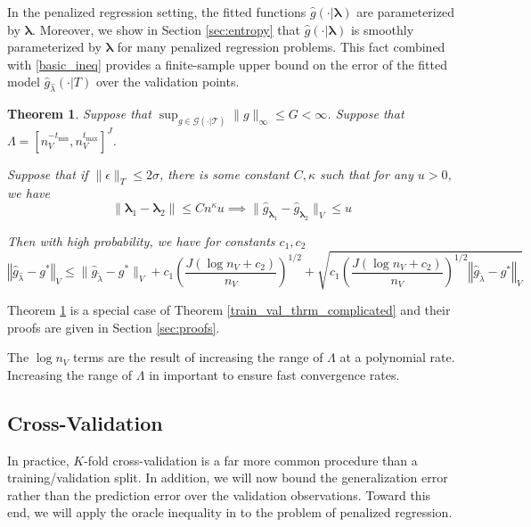 \documentclass[12pt]{article}
\newtheorem{theorem}{Theorem}
\begin{document}
In the penalized regression setting, the fitted functions $\hat{g}(\cdot | \boldsymbol \lambda)$ are parameterized by $\boldsymbol \lambda$. Moreover, we show in Section \ref{sec:entropy} that $\hat{g}(\cdot | \boldsymbol \lambda)$ is smoothly parameterized by $\boldsymbol \lambda$ for many penalized regression problems. This fact combined with \eqref{basic_ineq} provides a finite-sample upper bound on the error of the fitted model $\hat{g}_{\hat \lambda}(\cdot | T)$ over the validation points.

\begin{theorem}
\label{train_val_thrm}
Suppose that $\sup_{g \in \mathcal{G(\cdot | T)}} \| g \|_\infty \le G < \infty$.
Suppose that $\Lambda = [ n_V^{-t_{\min}}, n_V^{t_{\max}} ]^J $.

Suppose that if $\| \epsilon \|_T \le 2 \sigma $, there is some constant $C, \kappa$ such that for any $u> 0$, we have
\begin{equation}
\| \boldsymbol \lambda_1 - \boldsymbol \lambda_2 \| \le C n^\kappa u \implies \| \hat{g}_{\boldsymbol \lambda_1} - \hat{g}_{\boldsymbol \lambda_2} \|_V \le u
\end{equation}

Then with high probability, we have for constants $c_1, c_2$
\begin{equation}
\label{error_bound}
\left\Vert \hat{g}_{\hat{\lambda}}-g^{*}\right\Vert _{V} \le
\|\hat{g}_{\tilde{\lambda}}-g^{*}\|_{V}
+c_{1} \left (\frac{J(\log n_{V}+c_{2})}{n_{V}} \right )^{1/2}
+\sqrt{ c_{1} \left (\frac{J(\log n_{V}+c_{2})}{n_{V}} \right )^{1/2} \left\Vert \hat{g}_{\tilde{\lambda}}-g^{*}\right\Vert _{V}}
\end{equation}
\end{theorem}
Theorem \ref{train_val_thrm} is a special case of Theorem \ref{train_val_thrm_complicated} and their proofs are given in Section \ref{sec:proofs}.

The $\log n_V$ terms are the result of increasing the range of $\Lambda$ at a polynomial rate. Increasing the range of $\Lambda$ in important to ensure fast convergence rates.



\subsection{Cross-Validation}

In practice, $K$-fold cross-validation is a far more common procedure than a training/validation split. In addition, we will now bound the generalization error rather than the prediction error over the validation observations. Toward this end, we will apply the oracle inequality in \citet{lecue2012oracle} to the problem of penalized regression.
\end{document}
